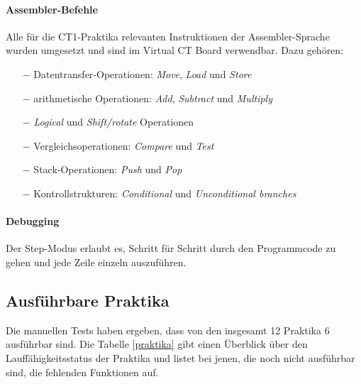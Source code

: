 \documentclass[10pt]{article}
\begin{document}
\paragraph{Assembler-Befehle} Alle für die CT1-Praktika relevanten Instruktionen der Assembler-Sprache wurden umgesetzt und sind im \glqq Virtual CT Board\grqq{} verwendbar. Dazu gehören:
\begin{itemize}
	\item[$-$] Datentransfer-Operationen: \emph{Move}, \emph{Load} und \emph{Store}
	\item[$-$] arithmetische Operationen: \emph{Add}, \emph{Subtract} und \emph{Multiply}
	\item[$-$] \emph{Logical} und \emph{Shift/rotate} Operationen
	\item[$-$] Vergleichsoperationen: \emph{Compare} und \emph{Test}
	\item[$-$] Stack-Operationen: \emph{Push} und \emph{Pop}
	\item[$-$] Kontrollstrukturen: \emph{Conditional} und \emph{Unconditional branches}
\end{itemize}

\paragraph{Debugging} Der Step-Modus erlaubt es, Schritt für Schritt durch den Programmcode zu gehen und jede Zeile einzeln auszuführen.

\subsection{Ausführbare Praktika}

Die manuellen Tests haben ergeben, dass von den insgesamt 12 Praktika 6 ausführbar sind. Die Tabelle \ref{praktika} gibt einen Überblick über den Lauffähigkeitsstatus der Praktika und listet bei jenen, die noch nicht ausführbar sind, die fehlenden Funktionen auf.
\end{document}
